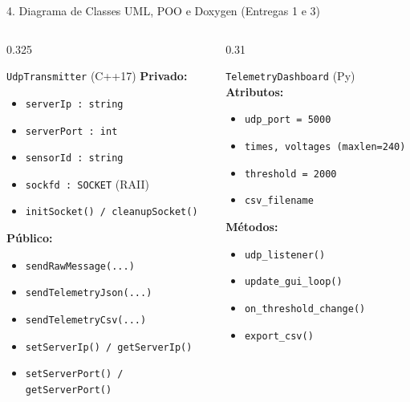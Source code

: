 \documentclass[aspectratio=169,10pt]{beamer}
\begin{document}
\begin{frame}[fragile]{4. Diagrama de Classes UML, POO e Doxygen (Entregas 1 e 3)}
\begin{columns}[T,onlytextwidth]
    \begin{column}{0.325\textwidth}
      \begin{block}{\texttt{UdpTransmitter} (C++17)}
        \tiny
        \textbf{Privado:}
        \begin{itemize}\setlength\itemsep{1pt}
          \item \texttt{serverIp : string}
          \item \texttt{serverPort : int}
          \item \texttt{sensorId : string}
          \item \texttt{sockfd : SOCKET} (RAII)
          \item \texttt{initSocket() / cleanupSocket()}
        \end{itemize}
        \textbf{P\'{u}blico:}
        \begin{itemize}\setlength\itemsep{1pt}
          \item \texttt{sendRawMessage(...)}
          \item \texttt{sendTelemetryJson(...)}
          \item \texttt{sendTelemetryCsv(...)}
          \item \texttt{setServerIp() / getServerIp()}
          \item \texttt{setServerPort() / getServerPort()}
        \end{itemize}
      \end{block}
    \end{column}

    \begin{column}{0.31\textwidth}
      \begin{exampleblock}{\texttt{TelemetryDashboard} (Py)}
        \tiny
        \textbf{Atributos:}
        \begin{itemize}\setlength\itemsep{1pt}
          \item \texttt{udp\_port = 5000}
          \item \texttt{times, voltages (maxlen=240)}
          \item \texttt{threshold = 2000}
          \item \texttt{csv\_filename}
        \end{itemize}
        \textbf{M\'{e}todos:}
        \begin{itemize}\setlength\itemsep{1pt}
          \item \texttt{udp\_listener()}
          \item \texttt{update\_gui\_loop()}
          \item \texttt{on\_threshold\_change()}
          \item \texttt{export\_csv()}
        \end{itemize}
      \end{exampleblock}
    \end{column}
  \end{columns}


\end{frame}
\end{document}
